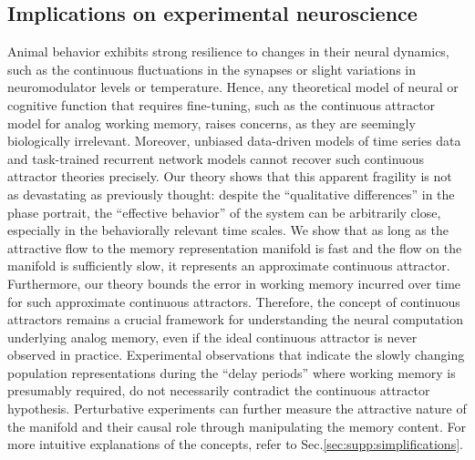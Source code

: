 \documentclass{article} %
\newcommand{\mpcomment}[1]{\textcolor{mpcolor}{(#1)}}
\newcounter{ct}
\theoremstyle{definition}
\theoremstyle{remark}
\begin{document}

\subsection{Implications on experimental neuroscience}\label{sec:implications}
Animal behavior exhibits strong resilience to changes in their neural dynamics, such as the continuous fluctuations in the synapses or slight variations in neuromodulator levels or temperature.
Hence, any theoretical model of neural or cognitive function that requires fine-tuning, such as the continuous attractor model for analog working memory, raises concerns, as they are seemingly biologically irrelevant.
Moreover, unbiased data-driven models of time series data and task-trained recurrent network models cannot recover such continuous attractor theories precisely.
Our theory shows that this apparent fragility is not as devastating as previously thought: despite the ``qualitative differences'' in the phase portrait, the ``effective behavior'' of the system can be arbitrarily close, especially in the behaviorally relevant time scales.
We show that as long as the attractive flow to the memory representation manifold is fast and the flow on the manifold is sufficiently slow, it represents an approximate continuous attractor.
Furthermore, our theory bounds the error in working memory incurred over time for such approximate continuous attractors.
Therefore, the concept of continuous attractors remains a crucial framework for understanding the neural computation underlying analog memory, even if the ideal continuous attractor is never observed in practice.
Experimental observations that indicate the slowly changing population representations during the ``delay periods'' where working memory is presumably required, do not necessarily contradict the continuous attractor hypothesis. Perturbative experiments can further measure the attractive nature of the manifold and their causal role through manipulating the memory content.
For more intuitive explanations of the concepts, refer to Sec.\ref{sec:supp:simplifications}.
\end{document}
